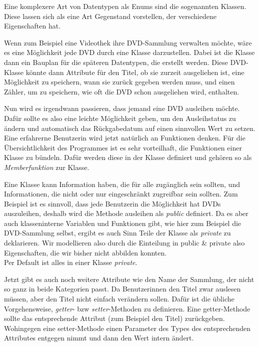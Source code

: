 
Eine komplexere Art von Datentypen als Enums sind die sogenannten Klassen. Diese lassen sich als eine Art Gegenstand vorstellen, der verschiedene Eigenschaften hat.

Wenn zum Beispiel eine Videothek ihre DVD-Sammlung verwalten möchte, wäre es eine Möglichkeit jede DVD durch eine Klasse darzustellen. Dabei ist die Klasse dann ein Bauplan für die späteren Datentypen, die erstellt werden. Diese DVD-Klasse könnte dann Attribute für den Titel, ob sie zurzeit ausgeliehen ist, eine Möglichkeit zu speichern, wann sie zurück gegeben werden muss, und einen Zähler, um zu speichern, wie oft die DVD schon ausgeliehen wird, enthalten.

Nun wird es irgendwann passieren, dass jemand eine DVD ausleihen möchte. Dafür sollte es also eine leichte Möglichkeit geben, um den Ausleihstatus zu ändern und automatisch das Rückgabedatum auf einen sinnvollen Wert zu setzen.
Eine erfahrerne Benutzerin wird jetzt natürlich an Funktionen denken. Für die
Übersichtlichkeit des Programmes ist es sehr vorteilhaft, die Funktionen einer
Klasse zu bündeln. Dafür werden diese in der Klasse definiert und gehören so als
\emph{Memberfunktion} zur Klasse.


Eine Klasse kann Information haben, die für alle zugänglich sein sollten, und Informationen, die nicht oder nur eingeschränkt zugreifbar sein sollten. Zum Beispiel ist es sinnvoll, dass jede Benutzerin die Möglichkeit hat DVDs auszuleihen, deshalb wird die Methode ausleihen als \emph{public} definiert.
Da es aber auch klasseninterne Variablen und Funktionen gibt, wie hier zum
Beispiel die DVD-Sammlung selbst, ergibt es auch Sinn Teile der Klasse als
\emph{private} zu deklarieren. Wir modellieren also durch die Einteilung in public \&
private also Eigenschaften, die wir bisher nicht abbilden konnten. \\
Per Default ist alles in einer Klasse \emph{private}.

Jetzt gibt es auch noch weitere Attribute wie den Name der Sammlung, der nicht
so ganz in beide Kategorien passt. Da Benutzerinnen den Titel zwar auslesen müssen, aber den Titel nicht einfach verändern sollen. Dafür ist die übliche Vorgehensweise, \emph{getter}- bzw \emph{setter}-Methoden zu definieren. Eine getter-Methode sollte das entsprechende Attribut (zum Beispiel den Titel) zurückgeben. Wohingegen eine setter-Methode einen Parameter des Types des entsprechenden Attributes entgegen nimmt und dann den Wert intern ändert.

